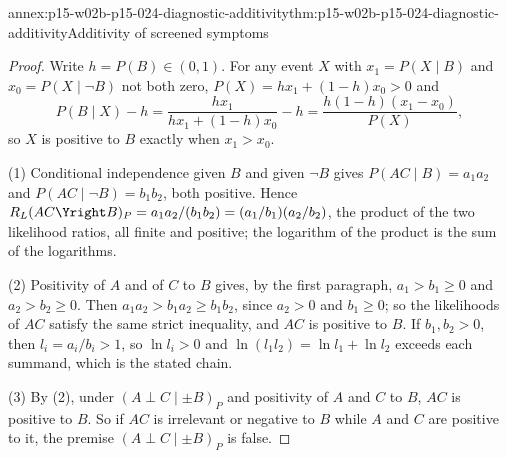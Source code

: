 \begin{annexitem}{annex:p15-w02b-p15-024-diagnostic-additivity}{thm:p15-w02b-p15-024-diagnostic-additivity}{Additivity of screened symptoms}
\begin{proof}
Write \(h=P(B)\in(0,1)\). For any event \(X\) with
\(x_1=P(X\mid B)\) and \(x_0=P(X\mid\neg B)\) not both zero,
\(P(X)=hx_1+(1-h)x_0>0\) and
\[
 P(B\mid X)-h=\frac{hx_1}{hx_1+(1-h)x_0}-h
 =\frac{h(1-h)(x_1-x_0)}{P(X)},
\]
so \(X\) is positive to \(B\) exactly when \(x_1>x_0\).

(1) Conditional independence given \(B\) and given \(\neg B\) gives
\(P(AC\mid B)=a_1a_2\) and \(P(AC\mid\neg B)=b_1b_2\), both positive.
Hence \(R_L(AC\Yright B)_P=a_1a_2/(b_1b_2)=(a_1/b_1)(a_2/b_2)\), the
product of the two likelihood ratios, all finite and positive; the
logarithm of the product is the sum of the logarithms.

(2) Positivity of \(A\) and of \(C\) to \(B\) gives, by the first
paragraph, \(a_1>b_1\geq0\) and \(a_2>b_2\geq0\). Then
\(a_1a_2>b_1a_2\geq b_1b_2\), since \(a_2>0\) and \(b_1\geq0\); so the
likelihoods of \(AC\) satisfy the same strict inequality, and \(AC\) is
positive to \(B\). If \(b_1,b_2>0\), then \(l_i=a_i/b_i>1\), so
\(\ln l_i>0\) and \(\ln(l_1l_2)=\ln l_1+\ln l_2\) exceeds each
summand, which is the stated chain.

(3) By (2), under \((A\perp C\mid\pm B)_P\) and positivity of \(A\) and
\(C\) to \(B\), \(AC\) is positive to \(B\). So if \(AC\) is irrelevant
or negative to \(B\) while \(A\) and \(C\) are positive to it, the
premise \((A\perp C\mid\pm B)_P\) is false.
\end{proof}
\end{annexitem}

